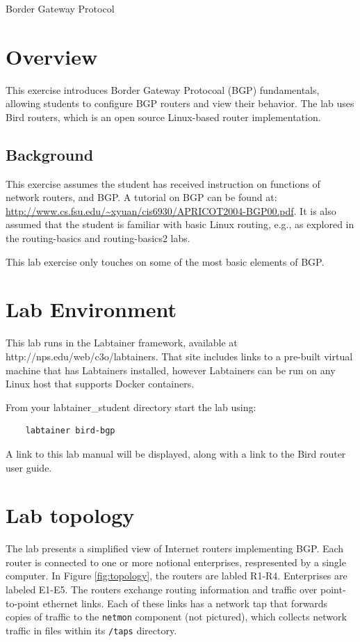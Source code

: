 


\begin{center}
{\LARGE Border Gateway Protocol}
\vspace{0.1in}\\
\end{center}


\section{Overview}
This exercise introduces Border Gateway Protocoal (BGP) fundamentals,
allowing students to configure BGP routers and view their behavior.
The lab uses Bird routers, which is an open source Linux-based router
implementation.

\subsection{Background}
This exercise assumes the student has received instruction on functions
of network routers, and BGP.  A tutorial on BGP can be found at:
\url{http://www.cs.fsu.edu/~xyuan/cis6930/APRICOT2004-BGP00.pdf}.  It is also assumed
that the student is familiar with basic Linux routing, e.g., as explored in the
routing-basics and routing-basics2 labs.

This lab exercise only touches on some of the most basic elements of BGP.

\section{Lab Environment}
This lab runs in the Labtainer framework,
available at http://nps.edu/web/c3o/labtainers.
That site includes links to a pre-built virtual machine
that has Labtainers installed, however Labtainers can
be run on any Linux host that supports Docker containers.

From your labtainer_student directory start the lab using:
\begin{verbatim}
    labtainer bird-bgp
\end{verbatim}
A link to this lab manual will be displayed, along with a link to the Bird router 
user guide.

\section{Lab topology}
The lab presents a simplified view of Internet routers implementing BGP.  Each router is connected to one or more notional
enterprises, respresented by a single computer.  In Figure \ref{fig:topology}, the routers are labled R1-R4.  Enterprises
are labeled E1-E5.  The routers exchange routing information and traffic over point-to-point ethernet links.
Each of these links has a network tap that forwards copies of traffic to the {\tt netmon} component (not pictured), 
which collects network traffic in files within its {\tt /taps} directory.

